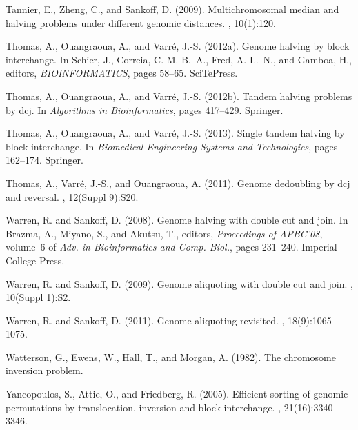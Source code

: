 \documentclass[11pt,final,twoside,nofrench]{thlifl}
\begin{document}
{\begin{thebibliography}{}
Tannier, E., Zheng, C., and Sankoff, D. (2009).
\newblock Multichromosomal median and halving problems under different genomic
  distances.
, 10(1):120.

Thomas, A., Ouangraoua, A., and Varré, J.-S. (2012a).
\newblock Genome halving by block interchange.
\newblock In Schier, J., Correia, C. M. B.~A., Fred, A. L.~N., and Gamboa, H.,
  editors, {\em BIOINFORMATICS}, pages 58--65. SciTePress.

Thomas, A., Ouangraoua, A., and Varr{\'e}, J.-S. (2012b).
\newblock Tandem halving problems by dcj.
\newblock In {\em Algorithms in Bioinformatics}, pages 417--429. Springer.

Thomas, A., Ouangraoua, A., and Varr{\'e}, J.-S. (2013).
\newblock Single tandem halving by block interchange.
\newblock In {\em Biomedical Engineering Systems and Technologies}, pages
  162--174. Springer.

Thomas, A., Varr{\'e}, J.-S., and Ouangraoua, A. (2011).
\newblock Genome dedoubling by dcj and reversal.
, 12(Suppl 9):S20.

Warren, R. and Sankoff, D. (2008).
\newblock Genome halving with double cut and join.
\newblock In Brazma, A., Miyano, S., and Akutsu, T., editors, {\em Proceedings
  of APBC'08}, volume~6 of {\em Adv. in Bioinformatics and Comp. Biol.}, pages
  231--240. Imperial College Press.

Warren, R. and Sankoff, D. (2009).
\newblock Genome aliquoting with double cut and join.
, 10(Suppl 1):S2.

Warren, R. and Sankoff, D. (2011).
\newblock Genome aliquoting revisited.
, 18(9):1065--1075.

Watterson, G., Ewens, W., Hall, T., and Morgan, A. (1982).
\newblock The chromosome inversion problem.

Yancopoulos, S., Attie, O., and Friedberg, R. (2005).
\newblock Efficient sorting of genomic permutations by translocation, inversion
  and block interchange.
, 21(16):3340--3346.


\end{thebibliography}}
\end{document}
